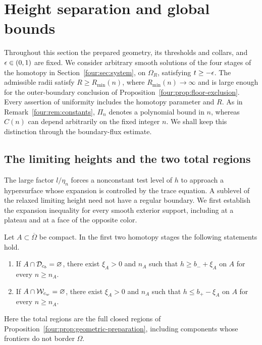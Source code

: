 \section{Height separation and global bounds}\label{four:sec:bounds}

Throughout this section the prepared geometry, its thresholds and collars,
and $\epsilon\in(0,1)$ are fixed.  We consider arbitrary smooth solutions of
the four stages of the homotopy in Section~\ref{four:sec:system}, on
$\Omega_R$, satisfying $t\ge-\epsilon$.  The admissible radii satisfy
$R\ge R_{\min}(n)$, where $R_{\min}(n)\to\infty$ and is large enough for
the outer-boundary conclusion of Proposition~\ref{four:prop:floor-exclusion}.
Every assertion of uniformity includes the homotopy parameter and $R$.
As in Remark~\ref{four:rem:constants}, $\Pi_n$ denotes a polynomial bound in
$n$, whereas $C(n)$ can depend arbitrarily on the fixed integer $n$.
We shall keep this distinction through the boundary-flux estimate.

\subsection{The limiting heights and the two total regions}

The large factor $l/\eta_n$ forces a nonconstant test level of $h$ to
approach a hypersurface whose expansion is controlled by the trace
equation.  A sublevel of the relaxed limiting height need not have a
regular boundary.  We first establish the expansion inequality for
every smooth exterior support, including at a plateau and at a face
of the opposite color.

\begin{proposition}
\label{four:prop:height-exclusion}
Let $A\subset\overline\Omega$ be compact.  In the first two homotopy
stages the following statements hold.
\begin{enumerate}[label=\textup{(\roman*)}]
\item If $A\cap\mathcal D_{c_b}=\varnothing$, there exist $\xi_A>0$ and
$n_A$ such that $h\ge b_-+\xi_A$ on $A$ for every $n\ge n_A$.
\item If $A\cap\mathcal W_{c_w}=\varnothing$, there exist $\xi_A>0$ and
$n_A$ such that $h\le b_+-\xi_A$ on $A$ for every $n\ge n_A$.
\end{enumerate}
Here the total regions are the full closed regions of
Proposition~\ref{four:prop:geometric-preparation}, including components whose
frontiers do not border $\Omega$.
\end{proposition}


